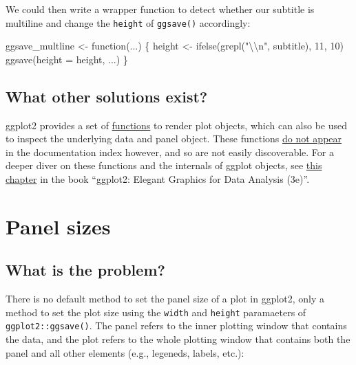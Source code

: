 \documentclass[
  letterpaper,
  DIV=11,
  numbers=noendperiod]{scrreprt}
\newenvironment{Shaded}{\begin{snugshade}}{\end{snugshade}}
\newcommand{\AttributeTok}[1]{\textcolor[rgb]{0.40,0.45,0.13}{#1}}
\newcommand{\ControlFlowTok}[1]{\textcolor[rgb]{0.00,0.23,0.31}{#1}}
\newcommand{\DecValTok}[1]{\textcolor[rgb]{0.68,0.00,0.00}{#1}}
\newcommand{\FunctionTok}[1]{\textcolor[rgb]{0.28,0.35,0.67}{#1}}
\newcommand{\NormalTok}[1]{\textcolor[rgb]{0.00,0.23,0.31}{#1}}
\newcommand{\OtherTok}[1]{\textcolor[rgb]{0.00,0.23,0.31}{#1}}
\newcommand{\SpecialCharTok}[1]{\textcolor[rgb]{0.37,0.37,0.37}{#1}}
\newcommand{\StringTok}[1]{\textcolor[rgb]{0.13,0.47,0.30}{#1}}
\begin{document}
We could then write a wrapper function to detect whether our subtitle is
multiline and change the \texttt{height} of \texttt{ggsave()}
accordingly:

\begin{Shaded}
\begin{Highlighting}[]
\NormalTok{ggsave\_multline }\OtherTok{\textless{}{-}} \ControlFlowTok{function}\NormalTok{(...) \{}
\NormalTok{  height }\OtherTok{\textless{}{-}} \FunctionTok{ifelse}\NormalTok{(}\FunctionTok{grepl}\NormalTok{(}\StringTok{"}\SpecialCharTok{\textbackslash{}\textbackslash{}}\StringTok{n"}\NormalTok{, subtitle), }\DecValTok{11}\NormalTok{, }\DecValTok{10}\NormalTok{)}
  \FunctionTok{ggsave}\NormalTok{(}\AttributeTok{height =}\NormalTok{ height, ...)}
\NormalTok{\}}
\end{Highlighting}
\end{Shaded}

\section{What other solutions exist?}\label{what-other-solutions-exist}

ggplot2 provides a set of
\href{https://ggplot2.tidyverse.org/reference/ggplot_build.html}{functions}
to render plot objects, which can also be used to inspect the underlying
data and panel object. These functions
\href{https://github.com/tidyverse/ggplot2/blob/HEAD/R/plot-build.R\#L21}{do
not appear} in the documentation index however, and so are not easily
discoverable. For a deeper diver on these functions and the internals of
ggplot objects, see \href{https://ggplot2-book.org/internals}{this
chapter} in the book ``ggplot2: Elegant Graphics for Data Analysis
(3e)''.

\chapter{Panel sizes}\label{panel-sizes}

\section{What is the problem?}\label{what-is-the-problem-3}

There is no default method to set the panel size of a plot in ggplot2,
only a method to set the plot size using the \texttt{width} and
\texttt{height} paramaeters of \texttt{ggplot2::ggsave()}. The panel
refers to the inner plotting window that contains the data, and the plot
refers to the whole plotting window that contains both the panel and all
other elements (e.g., legeneds, labels, etc.):
\end{document}
